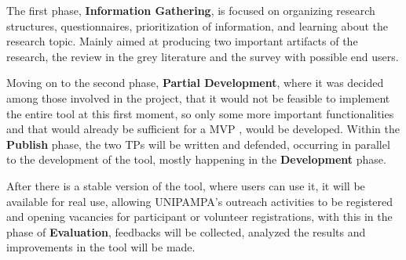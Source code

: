 
The first phase, \textbf{Information Gathering}, is focused on organizing research structures, questionnaires, prioritization of information, and learning about the research topic. Mainly aimed at producing two important artifacts of the research, the review in the grey literature and the survey with possible end users.


Moving on to the second phase, \textbf{Partial Development}, where it was decided among those involved in the project, that it would not be feasible to implement the entire tool at this first moment, so only some more important functionalities and that would already be sufficient for a \ac{MVP} \cite{Lenarduzzi:2016}, would be developed.
Within the \textbf{Publish} phase, the two \acp{TP} will be written and defended, occurring in parallel to the development of the tool, mostly happening in the \textbf{Development} phase.


After there is a stable version of the tool, where users can use it, it will be available for real use, allowing UNIPAMPA's outreach activities to be registered and opening vacancies for participant or volunteer registrations, with this in the phase of \textbf{Evaluation}, feedbacks will be collected, analyzed the results and improvements in the tool will be made.

